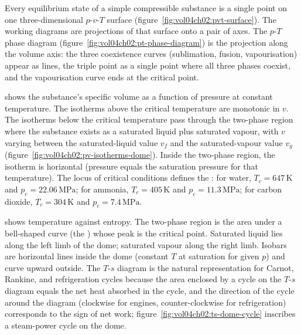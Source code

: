 

Every equilibrium state of a simple compressible substance is a single
point on one three-dimensional $p$-$v$-$T$ surface
(figure~\ref{fig:vol04ch02:pvt-surface}). The working diagrams are
projections of that surface onto a pair of axes. The $p$-$T$ phase
diagram (figure~\ref{fig:vol04ch02:pt-phase-diagram}) is the projection
along the volume axis: the three coexistence curves (sublimation, fusion,
vapourisation) appear as lines, the triple point as a single point where
all three phases coexist, and the vapourisation curve ends at the
critical point.



 shows the substance's specific volume
as a function of pressure at constant temperature. The isotherms
above the critical temperature are monotonic in $v$. The isotherms
below the critical temperature pass through the two-phase region
where the substance exists as a saturated liquid plus saturated
vapour, with $v$ varying between the saturated-liquid value $v_f$
and the saturated-vapour value $v_g$
(figure~\ref{fig:vol04ch02:pv-isotherms-dome}). Inside the two-phase region,
the isotherm is horizontal (pressure equals the saturation pressure
for that temperature). The locus of critical conditions defines the
: for water, $T_c = 647\,\si{\kelvin}$ and
$p_c = 22.06\,\text{MPa}$; for ammonia, $T_c = 405\,\si{\kelvin}$ and
$p_c = 11.3\,\text{MPa}$; for carbon dioxide, $T_c = 304\,\si{\kelvin}$
and $p_c = 7.4\,\text{MPa}$.



 shows temperature against entropy. The
two-phase region is the area under a bell-shaped curve (the
) whose peak is the critical point. Saturated
liquid lies along the left limb of the dome; saturated vapour along
the right limb. Isobars are horizontal lines inside the dome (constant
$T$ at saturation for given $p$) and curve upward outside. The $T$-$s$
diagram is the natural representation for Carnot, Rankine, and
refrigeration cycles because the area enclosed by a cycle on the
$T$-$s$ diagram equals the net heat absorbed in the cycle, and the
direction of the cycle around the diagram (clockwise for engines,
counter-clockwise for refrigeration) corresponds to the sign of net
work; figure~\ref{fig:vol04ch02:ts-dome-cycle} inscribes a steam-power
cycle on the dome.

